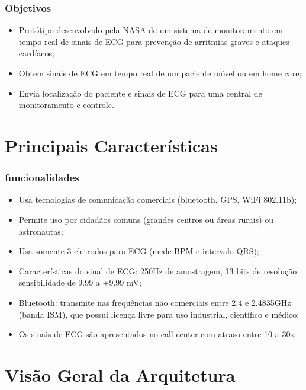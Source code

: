 \documentclass{beamer}
\begin{document}

\begin{frame}
	\frametitle{Objetivos}
	\begin{itemize}
		\item Protótipo desenvolvido pela NASA de um sistema de monitoramento em tempo real de sinais de ECG para prevenção de arritmias graves e ataques cardíacos;
		\item Obtem sinais de ECG em tempo real de um paciente móvel ou em home care;
		\item Envia localização do paciente e sinais de ECG para uma central de monitoramento e controle.
	\end{itemize}
\end{frame}

\section{Principais Características}

\begin{frame}
	\frametitle{funcionalidades}

	\begin{itemize}
		\item Usa tecnologias de comunicação comerciais (bluetooth, GPS, WiFi 802.11b);
		\item Permite uso por cidadãos comuns (grandes centros ou áreas rurais) ou astronautas;
		\item Usa somente 3 eletrodos para ECG (mede BPM e intervalo QRS);
		\item Características do sinal de ECG: 250Hz de amostragem, 13 bits de resolução, sensibilidade de 9.99 a +9.99 mV;
		\item Bluetooth: transmite nas frequências não comerciais entre 2.4 e 2.4835GHz (banda ISM), que possui licença livre para uso industrial, científico e médico;
		\item Os sinais de ECG são apresentados no call center com atraso entre 10 a 30s.
	\end{itemize}
\end{frame}

\section{Visão Geral da Arquitetura}
\end{document}
